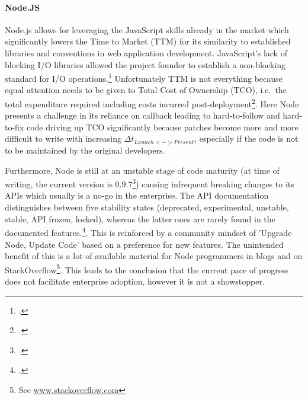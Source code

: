 \paragraph{Node.JS}
Node.js allows for leveraging the JavaScript skills already in the market which
significantly lowers the Time to Market (TTM)
for its similarity to established libraries and conventions in web application
development. JavaScript's lack of blocking I/O libraries allowed the project
founder to establish a non-blocking standard for I/O operations.\footcite[Cf.][]{Croucher_2012}
Unfortunately TTM is not everything because equal attention needs
to be given to Total Cost of Ownership (TCO), i.e.\ the total expenditure required including costs incurred
post-deployment\footcite[Cf.][203-207]{holtsnider_2010}. 
Here Node presents a challenge in its reliance on callback
leading to hard-to-follow and hard-to-fix code driving up TCO significantly
because patches become more and more difficult to write with increasing $\Delta
t_{Launch<->Present}$, especially if the code is not to be maintained by the %
original developers.

Furthermore, Node is still at an unstable stage of code maturity (at time of
writing, the current version is $0.9.7$\footcite[Cf.][]{node_unstable_2013})
causing infrequent breaking changes to its APIs which usually is a no-go in the enterprise.
The API documentation distinguishes between five stability states (deprecated,
experimental, unstable, stable, API frozen, locked), whereas the latter ones are
rarely found in the documented features.\footcite[Cf.][] {node_2012}.
This is reinforced by a community mindset of 'Upgrade Node, Update Code' based
on a preference for new features. The unintended benefit of this is a lot of
available material for Node programmers in blogs and on
StackOverflow\footnote{See \url{www.stackoverflow.com}}.
This leads to the conclusion that the current pace of progress does not
facilitate enterprise adoption, however it is not a showstopper.

